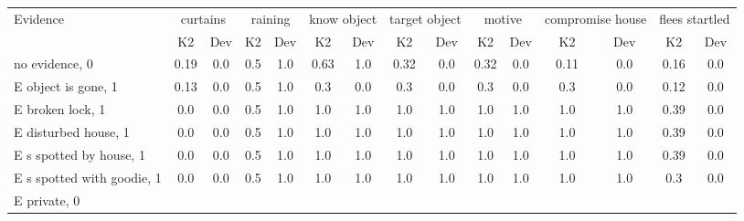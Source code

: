 \begin{table}\begin{tabular}{l|cc|cc|cc|cc|cc|cc|cc}\toprule\multirow{2}{*}{Evidence} & \multicolumn{2}{c}{curtains}& \multicolumn{2}{c}{raining}& \multicolumn{2}{c}{know object}& \multicolumn{2}{c}{target object}& \multicolumn{2}{c}{motive}& \multicolumn{2}{c}{compromise house}& \multicolumn{2}{c}{flees startled}\\& {K2} & {Dev}& {K2} & {Dev}& {K2} & {Dev}& {K2} & {Dev}& {K2} & {Dev}& {K2} & {Dev}& {K2} & {Dev}\\\midrule
no evidence, 0 & \cellcolor{Bittersweet}0.19&\cellcolor{Bittersweet}0.0&0.5&1.0&\cellcolor{Bittersweet}0.63&\cellcolor{Bittersweet}1.0&\cellcolor{Bittersweet}0.32&\cellcolor{Bittersweet}0.0&\cellcolor{Bittersweet}0.32&\cellcolor{Bittersweet}0.0&\cellcolor{Bittersweet}0.11&\cellcolor{Bittersweet}0.0&\cellcolor{Bittersweet}0.16&\cellcolor{Bittersweet}0.0\\E object is gone, 1 & \cellcolor{Bittersweet}0.13&\cellcolor{Bittersweet}0.0&0.5&1.0&\cellcolor{Bittersweet}0.3&\cellcolor{Bittersweet}0.0&\cellcolor{Bittersweet}0.3&\cellcolor{Bittersweet}0.0&\cellcolor{Bittersweet}0.3&\cellcolor{Bittersweet}0.0&\cellcolor{Bittersweet}0.3&\cellcolor{Bittersweet}0.0&\cellcolor{Bittersweet}0.12&\cellcolor{Bittersweet}0.0\\E broken lock, 1 & \cellcolor{Bittersweet}0.0&\cellcolor{Bittersweet}0.0&0.5&1.0&\cellcolor{Bittersweet}1.0&\cellcolor{Bittersweet}1.0&\cellcolor{Bittersweet}1.0&\cellcolor{Bittersweet}1.0&\cellcolor{Bittersweet}1.0&\cellcolor{Bittersweet}1.0&\cellcolor{Bittersweet}1.0&\cellcolor{Bittersweet}1.0&\cellcolor{Bittersweet}0.39&\cellcolor{Bittersweet}0.0\\E disturbed house, 1 & \cellcolor{Bittersweet}0.0&\cellcolor{Bittersweet}0.0&0.5&1.0&\cellcolor{Bittersweet}1.0&\cellcolor{Bittersweet}1.0&\cellcolor{Bittersweet}1.0&\cellcolor{Bittersweet}1.0&\cellcolor{Bittersweet}1.0&\cellcolor{Bittersweet}1.0&\cellcolor{Bittersweet}1.0&\cellcolor{Bittersweet}1.0&\cellcolor{Bittersweet}0.39&\cellcolor{Bittersweet}0.0\\E s spotted by house, 1 & \cellcolor{Bittersweet}0.0&\cellcolor{Bittersweet}0.0&0.5&1.0&\cellcolor{Bittersweet}1.0&\cellcolor{Bittersweet}1.0&\cellcolor{Bittersweet}1.0&\cellcolor{Bittersweet}1.0&\cellcolor{Bittersweet}1.0&\cellcolor{Bittersweet}1.0&\cellcolor{Bittersweet}1.0&\cellcolor{Bittersweet}1.0&\cellcolor{Bittersweet}0.39&\cellcolor{Bittersweet}0.0\\E s spotted with goodie, 1 & \cellcolor{Bittersweet}0.0&\cellcolor{Bittersweet}0.0&0.5&1.0&\cellcolor{Bittersweet}1.0&\cellcolor{Bittersweet}1.0&\cellcolor{Bittersweet}1.0&\cellcolor{Bittersweet}1.0&\cellcolor{Bittersweet}1.0&\cellcolor{Bittersweet}1.0&\cellcolor{Bittersweet}1.0&\cellcolor{Bittersweet}1.0&\cellcolor{Bittersweet}0.3&\cellcolor{Bittersweet}0.0\\E private, 0 & 
\end{tabular}
\end{table}
